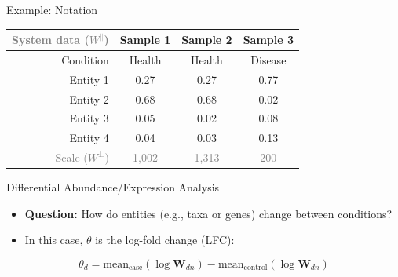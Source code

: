 \documentclass[
  ignorenonframetext,
]{beamer}
\providecommand{\tightlist}{%
  \setlength{\itemsep}{0pt}\setlength{\parskip}{0pt}}
\begin{document}
\begin{frame}{Example: Notation}
\protect\hypertarget{example-notation}{}
\begin{table}[h!]
\centering
\begin{tabular}{|r|c c c| }
\hline
\textcolor{gray}{System data ($W^\parallel$)} & Sample 1 & Sample 2 & Sample 3\\
\hline
Condition & Health & Health & Disease\\
\hline
Entity 1 & 0.27 & 0.27 & 0.77 \\
Entity 2 & 0.68 & 0.68 & 0.02 \\
Entity 3 & 0.05 & 0.02 & 0.08 \\
Entity 4 & 0.04 & 0.03  & 0.13 \\
\hline
\textcolor{gray}{Scale ($W^\perp$)} & \textcolor{gray}{1,002} & \textcolor{gray}{1,313} & \textcolor{gray}{200}\\
\hline
\end{tabular}
\end{table}
\end{frame}

\begin{frame}{Differential Abundance/Expression Analysis}
\protect\hypertarget{differential-abundanceexpression-analysis}{}
\begin{itemize}
\tightlist
\item
  \textbf{Question:} How do entities (e.g., taxa or genes) change
  between conditions?
\end{itemize}

\vspace{.25in}

\begin{itemize}
\tightlist
\item
  In this case, \(\theta\) is the log-fold change (LFC):
\end{itemize}

\begin{equation*}
\theta_d = \text{mean}_{\text{case}}(\log \mathbf{W}_{dn}) - \text{mean}_{\text{control}}(\log \mathbf{W}_{dn})
\end{equation*}
\end{frame}
\end{document}
